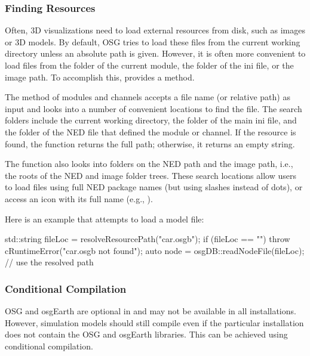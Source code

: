 \subsubsection{Finding Resources}
\label{sec:graphics:finding-resources}

Often, 3D visualizations need to load external resources from disk, such as
images or 3D models. By default, OSG tries to load these files from the current
working directory unless an absolute path is given. However, it is often more
convenient to load files from the folder of the current {\opp} module, the
folder of the ini file, or the image path. To accomplish this, {\opp} provides a
 method.

The  method of modules and channels accepts a file
name (or relative path) as input and looks into a number of convenient locations
to find the file. The search folders include the current working directory, the
folder of the main ini file, and the folder of the NED file that defined the
module or channel. If the resource is found, the function returns the full path;
otherwise, it returns an empty string.

The function also looks into folders on the NED path and the image path, i.e.,
the roots of the NED and image folder trees. These search locations allow users
to load files using full NED package names (but using slashes instead of dots),
or access an icon with its full name (e.g., ).

Here is an example that attempts to load a  model file:

\begin{cpp}
std::string fileLoc = resolveResourcePath("car.osgb");
if (fileLoc == "")
    throw cRuntimeError("car.osgb not found");
auto node = osgDB::readNodeFile(fileLoc); // use the resolved path
\end{cpp}


\subsubsection{Conditional Compilation}
\label{sec:graphics:osg-conditional-compilation}

OSG and osgEarth are optional in {\opp} and may not be available in all
installations. However, simulation models should still compile even if the
particular {\opp} installation does not contain the OSG and osgEarth libraries.
This can be achieved using conditional compilation.

